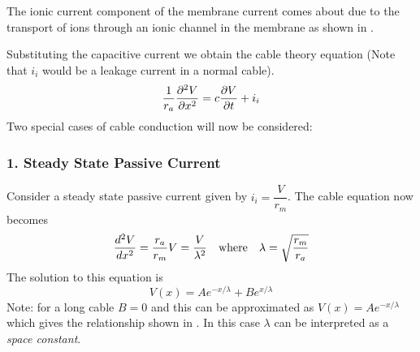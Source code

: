 The ionic current component of the membrane current comes about due to the 
transport of ions through an ionic channel in the membrane as shown in
.


Substituting the capacitive current we obtain the cable theory equation (Note
that $i_{i}$ would be a leakage current in a normal cable).
\begin{equation}
  \dfrac{1}{r_{a}} \dfrac{\partial^{2} V}{\partial {x}^{2}} =c \dfrac{\partial V}{\partial t} +i_{i}
  \label{eqn:cabletheoryequation}
\end{equation}
Two special cases of cable conduction will now be considered:
\subsubsection{1. Steady State Passive Current}
Consider a steady state passive current given by $i_{i}=\dfrac{V}{r_{m}}$. The
cable equation now becomes
\begin{equation*}
   \dfrac{ d^{2} V}{d {x}^{2}} =\dfrac{r_{a}}{r_{m}}V=\dfrac{V}{\lambda^{2}}\quad\text{where}
  \quad\lambda=\sqrt{\dfrac{r_{m}}{r_{a}}}
\end{equation*}
The solution to this equation is
\begin{equation}
  V(x)=Ae^{-x/\lambda}+Be^{x/\lambda}
  \label{eqn:longsscable}
\end{equation}
Note: for a long cable $B=0$ and this can be approximated as
$V(x)=Ae^{-x/\lambda}$ which gives the relationship shown in
. In this case $\lambda$ can be interpreted as a {\em
  space constant}.


